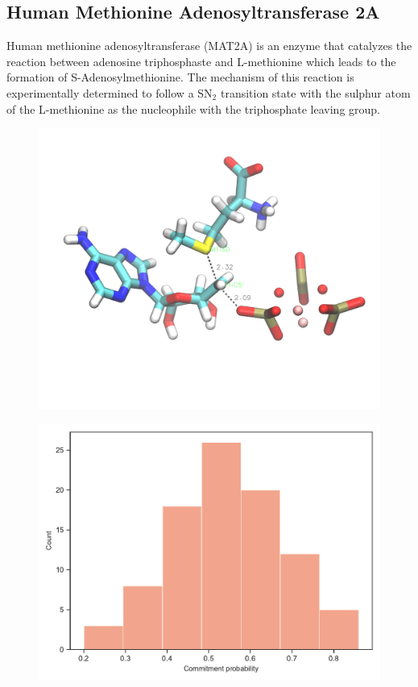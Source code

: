 \documentclass[journal=jpcbfk,manuscript=article,layout=traditional]{achemso}
\begin{document}
\subsection{Human Methionine Adenosyltransferase 2A}
Human methionine adenosyltransferase (MAT2A) is an enzyme that catalyzes the 
reaction between adenosine triphosphaste and L-methionine which leads to the 
formation of S-Adenosylmethionine. \cite{Firestone17JAmChemSoc139p13754,Niland21Biochem60p791} 
The mechanism of this reaction is experimentally determined to follow a 
SN$_2$ transition state with the sulphur atom of the L-methionine as the 
nucleophile with the triphosphate leaving group.  

\begin{figure}[ht!]
\includegraphics[scale=0.25]{figures/mat2a-transition-state.png}
\end{figure}

\begin{figure}[ht!]
\includegraphics[scale=0.5]{figures/comm-60-mat2a.pdf}
\end{figure}
\end{document}

